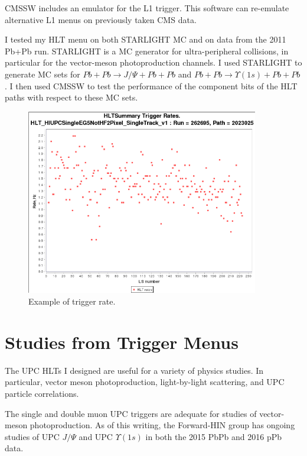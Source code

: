 CMSSW includes an emulator for the L1 trigger. This software can re-emulate alternative L1 menus on previously taken CMS data.

I tested my HLT menu on both STARLIGHT MC and on data from the 2011 Pb+Pb run. STARLIGHT is a MC generator for ultra-peripheral collisions, in particular for the vector-meson photoproduction channels. I used STARLIGHT to generate MC sets for $Pb+Pb\rightarrow J/\Psi+Pb+Pb$ and $Pb+Pb\rightarrow \Upsilon(1s)+Pb+Pb$. I then used CMSSW to test the performance of the component bits of the HLT paths with respect to these MC sets. 

\begin{figure}[h!]
\begin{centering}
\includegraphics[width=4in]{Chapter5/importfigs/triggerRateExample.png}
\par\end{centering}
\caption{Example of trigger rate. \label{fig:trigRate}}
\end{figure}

\section{Studies from Trigger Menus}

The UPC HLTs I designed are useful for a variety of physics studies. In particular, vector meson photoproduction, light-by-light scattering, and UPC particle correlations. 

The single and double muon UPC triggers are adequate for studies of vector-meson photoproduction. As of this writing, the Forward-HIN group has ongoing studies of UPC $J/\Psi$ and UPC $\Upsilon(1s)$ in both the 2015 PbPb and 2016 pPb data. 